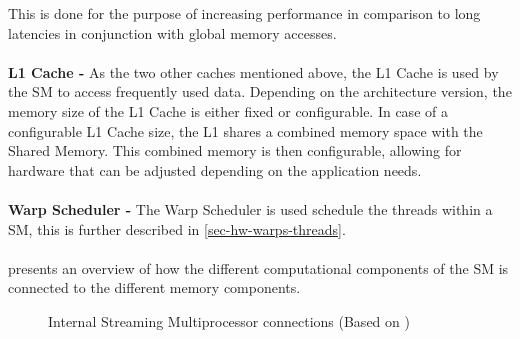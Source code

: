 This is done for the purpose of increasing performance in comparison to long latencies in conjunction with global memory accesses.
\\\\	
\textbf{L1 Cache -} As the two other caches mentioned above, the L1 Cache is used by the SM to access frequently used data. 
Depending on the architecture version, the memory size of the L1 Cache is either fixed or configurable.
In case of a configurable L1 Cache size, the L1 shares a combined memory space with the Shared Memory.
This combined memory is then configurable, allowing for hardware that can be adjusted depending on the application needs.
\\\\
\textbf{Warp Scheduler -} The Warp Scheduler is used schedule the threads within a SM, this is further described in \cref{sec-hw-warps-threads}.
\\\\	
 presents an overview of how the different computational components of the SM is connected to the different memory components.

\begin{figure}[H]
	\centering
	\caption{Internal Streaming Multiprocessor connections (Based on \cite{Cook2008})}
	\label{fig:hw-sm-inside}
\end{figure}